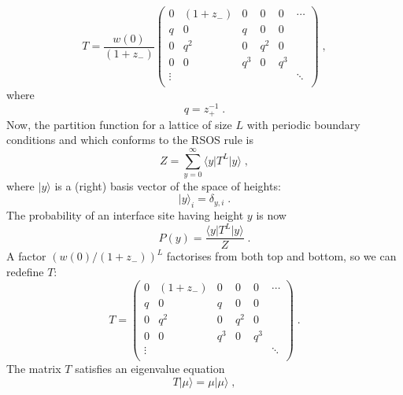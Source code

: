 \documentclass[a4paper,10pt]{article}
\newcommand{\py}{P(y)}
\newcommand{\wzero}{w(0)}
\newcommand{\bra}[1]{\langle #1 \vert}
\newcommand{\ket}[1]{\vert #1 \rangle}
\begin{document}
\begin{equation}
  T = \frac{\wzero}{(1+z_-)}
      \begin{pmatrix}
       0      & (1+z_-)& 0      & 0      & 0      & \cdots \\
       q      & 0      & q      & 0      & 0      &        \\
       0      & q^2    & 0      & q^2    & 0      &        \\
       0      & 0      & q^3    & 0      & q^3    &        \\
       \vdots &        &        &        &        & \ddots \\
      \end{pmatrix} \;,
\end{equation}
where 
\begin{equation}
  q = z_+^{-1} \;.
\end{equation}
Now, the partition function for  a lattice of size $L$ with periodic boundary conditions and which conforms to the RSOS rule is
\begin{equation}
  Z = \sum_{y=0}^\infty \bra{y} T^L \ket{y} \;,
\end{equation}
where $\ket{y}$ is a (right) basis vector of the space of heights:
\begin{equation}
  \ket{y}_i = \delta_{y,i} \;.
\end{equation}
The probability of an interface site having height $y$ is now 
\begin{equation}
  \py = \frac{\bra{y} T^L \ket{y}}{Z} \;.
\end{equation}
A factor $(\wzero/(1+z_-))^L$ factorises from both top and bottom, so we can redefine $T$:
\begin{equation}\label{eq:T}
  T = \begin{pmatrix}
       0      & (1+z_-)& 0      & 0      & 0      & \cdots \\
       q      & 0      & q      & 0      & 0      &        \\
       0      & q^2    & 0      & q^2    & 0      &        \\
       0      & 0      & q^3    & 0      & q^3    &        \\
       \vdots &        &        &        &        & \ddots \\
      \end{pmatrix} \;.
\end{equation}
The matrix $T$ satisfies an eigenvalue equation
\begin{equation}
  T \ket{\mu} = \mu \ket{\mu} \;,
\end{equation}
\end{document}
